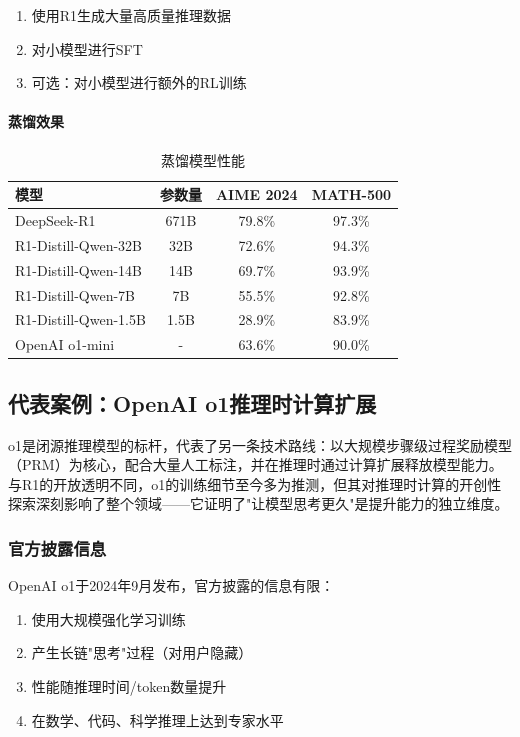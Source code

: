 \documentclass[12pt,a4paper]{article}
\begin{document}
\begin{enumerate}
    \item 使用R1生成大量高质量推理数据
    \item 对小模型进行SFT
    \item 可选：对小模型进行额外的RL训练
\end{enumerate}

\paragraph{蒸馏效果}

\begin{table}[H]
\centering
\caption{蒸馏模型性能}
\begin{tabular}{lccc}
\toprule
\textbf{模型} & \textbf{参数量} & \textbf{AIME 2024} & \textbf{MATH-500} \\
\midrule
DeepSeek-R1 & 671B & 79.8\% & 97.3\% \\
R1-Distill-Qwen-32B & 32B & 72.6\% & 94.3\% \\
R1-Distill-Qwen-14B & 14B & 69.7\% & 93.9\% \\
R1-Distill-Qwen-7B & 7B & 55.5\% & 92.8\% \\
R1-Distill-Qwen-1.5B & 1.5B & 28.9\% & 83.9\% \\
\midrule
OpenAI o1-mini & - & 63.6\% & 90.0\% \\
\bottomrule
\end{tabular}
\end{table}

\subsection{代表案例：OpenAI o1推理时计算扩展}

o1是闭源推理模型的标杆，代表了另一条技术路线：以大规模步骤级过程奖励模型（PRM）为核心，配合大量人工标注，并在推理时通过计算扩展释放模型能力。与R1的开放透明不同，o1的训练细节至今多为推测，但其对推理时计算的开创性探索深刻影响了整个领域——它证明了"让模型思考更久"是提升能力的独立维度。

\subsubsection{官方披露信息}

OpenAI o1于2024年9月发布，官方披露的信息有限：

\begin{enumerate}
    \item 使用大规模强化学习训练
    \item 产生长链"思考"过程（对用户隐藏）
    \item 性能随推理时间/token数量提升
    \item 在数学、代码、科学推理上达到专家水平
\end{enumerate}
\end{document}
